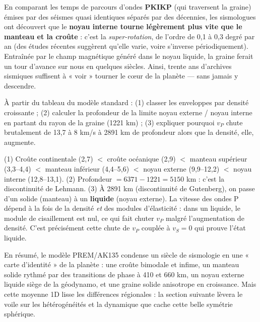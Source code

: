 \documentclass[11pt]{article}
\begin{document}
\begin{savaistu}
En comparant les temps de parcours d'ondes \textbf{PKIKP} (qui traversent la graine) émises par des séismes quasi identiques séparés par des décennies, les sismologues ont découvert que le \textbf{noyau interne tourne légèrement plus vite que le manteau et la croûte} : c'est la \emph{super-rotation}, de l'ordre de 0,1 à 0,3 degré par an (des études récentes suggèrent qu'elle varie, voire s'inverse périodiquement). Entraînée par le champ magnétique généré dans le noyau liquide, la graine ferait un tour d'avance sur nous en quelques siècles. Ainsi, trente ans d'archives sismiques suffisent à « voir » tourner le cœur de la planète — sans jamais y descendre.
\end{savaistu}

\begin{exercice}
À partir du tableau du modèle standard : (1) classer les enveloppes par densité croissante ; (2) calculer la profondeur de la limite noyau externe / noyau interne en partant du rayon de la graine (1221 km) ; (3) expliquer pourquoi $v_P$ chute brutalement de 13,7 à 8 km/s à 2891 km de profondeur alors que la densité, elle, augmente.
\end{exercice}

\begin{corrige}[Exercice]
(1) Croûte continentale (2,7) $<$ croûte océanique (2,9) $<$ manteau supérieur (3,3--4,4) $<$ manteau inférieur (4,4--5,6) $<$ noyau externe (9,9--12,2) $<$ noyau interne (12,8--13,1). (2) Profondeur $= 6371 - 1221 = 5150$ km : c'est la discontinuité de Lehmann. (3) À 2891 km (discontinuité de Gutenberg), on passe d'un solide (manteau) à un \textbf{liquide} (noyau externe). La vitesse des ondes P dépend à la fois de la densité \emph{et} des modules d'élasticité : dans un liquide, le module de cisaillement est nul, ce qui fait chuter $v_P$ malgré l'augmentation de densité. C'est précisément cette chute de $v_P$ couplée à $v_S = 0$ qui prouve l'état liquide.
\end{corrige}

En résumé, le modèle PREM/AK135 condense un siècle de sismologie en une « carte d'identité » de la planète : une croûte bimodale et infime, un manteau solide rythmé par des transitions de phase à 410 et 660 km, un noyau externe liquide siège de la géodynamo, et une graine solide anisotrope en croissance. Mais cette moyenne 1D lisse les différences régionales : la section suivante lèvera le voile sur les hétérogénéités et la dynamique que cache cette belle symétrie sphérique.
\end{document}

